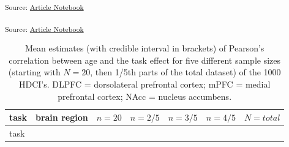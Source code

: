 \documentclass[
  letterpaper,
  DIV=11,
  numbers=noendperiod]{scrartcl}
\begin{document}
\textsubscript{Source:
\href{https://eduardklap.github.io/sample-size-fmri/sample-size-fmri-paper.qmd.html}{Article
Notebook}}

\textsubscript{Source:
\href{https://eduardklap.github.io/sample-size-fmri/sample-size-fmri-paper.qmd.html}{Article
Notebook}}

\begin{longtable}[]{@{}
  >{\raggedright\arraybackslash}p{}
  >{\raggedright\arraybackslash}p{}
  >{\raggedright\arraybackslash}p{}
  >{\raggedright\arraybackslash}p{}
  >{\raggedright\arraybackslash}p{}
  >{\raggedright\arraybackslash}p{}
  >{\raggedright\arraybackslash}p{}@{}}
\caption{Mean estimates (with credible interval in brackets) of
Pearson's correlation between age and the task effect for five different
sample sizes (starting with \(N = 20\), then 1/5th parts of the total
dataset) of the 1000 HDCI's. DLPFC = dorsolateral prefrontal cortex;
mPFC = medial prefrontal cortex; NAcc = nucleus
accumbens.}\label{tbl-3}\tabularnewline
\toprule\noalign{}
\begin{minipage}[b]{\linewidth}\raggedright
task
\end{minipage} & \begin{minipage}[b]{\linewidth}\raggedright
brain region
\end{minipage} & \begin{minipage}[b]{\linewidth}\raggedright
\(n = 20\)
\end{minipage} & \begin{minipage}[b]{\linewidth}\raggedright
\(n = 2/5\)
\end{minipage} & \begin{minipage}[b]{\linewidth}\raggedright
\(n = 3/5\)
\end{minipage} & \begin{minipage}[b]{\linewidth}\raggedright
\(n = 4/5\)
\end{minipage} & \begin{minipage}[b]{\linewidth}\raggedright
\(N = total\)
\end{minipage} \\
\midrule\noalign{}
\endfirsthead
\toprule\noalign{}
\begin{minipage}[b]{\linewidth}\raggedright
task
\end{minipage} & \begin{minipage}[b]{\linewidth}\raggedright

\end{minipage}
\end{longtable}
\end{document}
